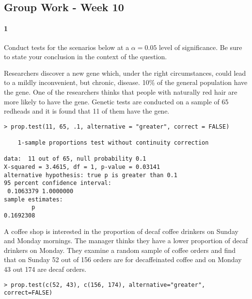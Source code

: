 \documentclass{article}
\begin{document}
\begin{flushleft}
\section*{Group Work - Week 10}

\paragraph{1} Conduct tests for the scenarios below at a $\alpha = 0.05$ level of significance. Be sure to state your conclusion in the context of the question.

\begin{enumalpha}
\item Researchers discover a new gene which, under the right circumstances, could lead to a mildly inconvenient, but chronic, disease. 10\% of the general population have the gene. One of the researchers thinks that people with naturally red hair are more likely to have the gene. Genetic tests are conducted on a sample of 65 redheads and it is found that 11 of them have the gene. \\
\medskip
\begin{verbatim}
> prop.test(11, 65, .1, alternative = "greater", correct = FALSE)

	1-sample proportions test without continuity correction

data:  11 out of 65, null probability 0.1
X-squared = 3.4615, df = 1, p-value = 0.03141
alternative hypothesis: true p is greater than 0.1
95 percent confidence interval:
 0.1063379 1.0000000
sample estimates:
        p 
0.1692308 
\end{verbatim}


\vspace{0.5in}

\newpage
\item A coffee shop is interested in the proportion of decaf coffee drinkers on Sunday and Monday mornings. The manager thinks they have a lower proportion of decaf drinkers on Monday. They examine a random sample of coffee orders and find that on Sunday 52 out of 156 orders are for decaffeinated coffee and on Monday 43 out 174 are decaf orders. \\
\medskip
\begin{verbatim}
> prop.test(c(52, 43), c(156, 174), alternative="greater", correct=FALSE)


\end{verbatim}
\end{enumalpha}
\end{flushleft}
\end{document}

